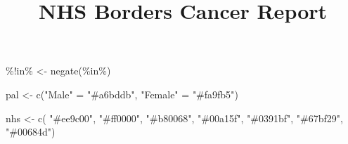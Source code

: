\documentclass[
]{article}
\title{NHS Borders Cancer Report}
\author{}
\date{\vspace{-2.5em}}
\newenvironment{Shaded}{\begin{snugshade}}{\end{snugshade}}
\newcommand{\AttributeTok}[1]{\textcolor[rgb]{0.77,0.63,0.00}{#1}}
\newcommand{\FunctionTok}[1]{\textcolor[rgb]{0.00,0.00,0.00}{#1}}
\newcommand{\NormalTok}[1]{#1}
\newcommand{\OtherTok}[1]{\textcolor[rgb]{0.56,0.35,0.01}{#1}}
\newcommand{\StringTok}[1]{\textcolor[rgb]{0.31,0.60,0.02}{#1}}
\begin{document}
\maketitle

\begin{Shaded}
\begin{Highlighting}[]
\StringTok{\textasciigrave{}}\AttributeTok{\%!in\%}\StringTok{\textasciigrave{}} \OtherTok{\textless{}{-}} \FunctionTok{negate}\NormalTok{(}\StringTok{\textasciigrave{}}\AttributeTok{\%in\%}\StringTok{\textasciigrave{}}\NormalTok{)}

\NormalTok{pal }\OtherTok{\textless{}{-}} \FunctionTok{c}\NormalTok{(}\StringTok{"Male"} \OtherTok{=} \StringTok{"\#a6bddb"}\NormalTok{, }\StringTok{"Female"} \OtherTok{=} \StringTok{"\#fa9fb5"}\NormalTok{)}

\NormalTok{nhs }\OtherTok{\textless{}{-}} \FunctionTok{c}\NormalTok{( }\StringTok{"\#ee9c00"}\NormalTok{, }\StringTok{"\#ff0000"}\NormalTok{, }
         \StringTok{"\#b80068"}\NormalTok{, }\StringTok{"\#00a15f"}\NormalTok{,}
         \StringTok{"\#0391bf"}\NormalTok{, }\StringTok{"\#67bf29"}\NormalTok{, }\StringTok{"\#00684d"}\NormalTok{)}


\end{Highlighting}
\end{Shaded}
\end{document}
